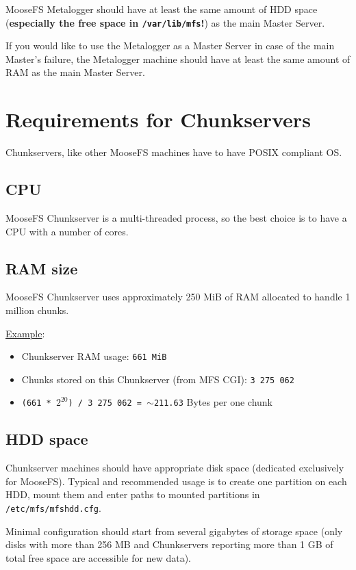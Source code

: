 \documentclass[a4paper,11pt,english]{report}
\def\code#1{\texttt{#1}}
\begin{document}
		MooseFS Metalogger should have at least the same amount of HDD space (\textbf{especially the free space in \code{/var/lib/mfs}!}) as the main Master Server.
		
		If you would like to use the Metalogger as a Master Server in case of the main Master's failure, the Metalogger machine should have at least the same amount of RAM as the main Master Server.

		\section{Requirements for Chunkservers}
		Chunkservers, like other MooseFS machines have to have POSIX compliant OS.
		
			\subsection{CPU}
			MooseFS Chunkserver is a multi-threaded process, so the best choice is to have a CPU with a number of cores.
			
			\subsection{RAM size}
			MooseFS Chunkserver uses approximately 250 MiB of RAM allocated to handle 1 million chunks.
			
			\underline{Example}:
			\begin{itemize}
				\item Chunkserver RAM usage: \code{661 MiB}
				\item Chunks stored on this Chunkserver (from MFS CGI): \code{3 275 062}
				\item \code{(661 * $2^{20}$) / 3 275 062 = $\sim$211.63} Bytes per one chunk
			\end{itemize}
			
			\subsection{HDD space}
			Chunkserver machines should have appropriate disk space (dedicated exclusively for MooseFS). Typical and recommended usage is to create one partition on each HDD, mount them and enter paths to mounted partitions in \code{/etc/mfs/mfshdd.cfg}.
		
			Minimal configuration should start from several gigabytes of storage space (only disks with more than 256 MB and Chunkservers reporting more than 1 GB of total free space are accessible for new data).
\end{document}
